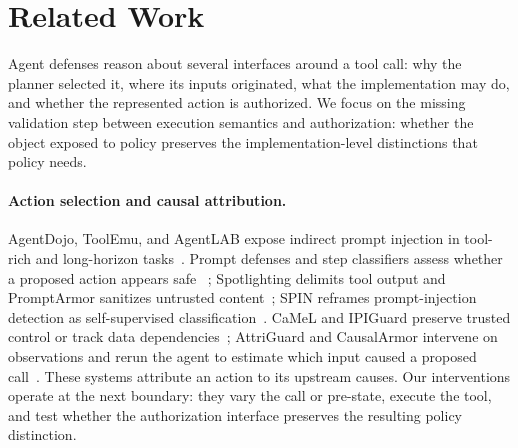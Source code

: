 \section{Related Work}

Agent defenses reason about several interfaces around a tool call: why the
planner selected it, where its inputs originated, what the implementation may
do, and whether the represented action is authorized. We focus on the missing
validation step between execution semantics and authorization: whether the
object exposed to policy preserves the implementation-level distinctions that
policy needs.

\paragraph{Action selection and causal attribution.}
AgentDojo, ToolEmu, and AgentLAB expose indirect prompt injection in tool-rich
and long-horizon tasks~\cite{agentdojo,toolemu,agentlab}. Prompt defenses and
step classifiers assess whether a proposed action appears safe
~\cite{toolsafe,safiron}; Spotlighting delimits tool output and PromptArmor
sanitizes untrusted content~\cite{spotlighting2024,promptarmor2025}; SPIN
reframes prompt-injection detection as self-supervised classification~\cite{zhou2024spin}. CaMeL and IPIGuard preserve trusted control or track
data dependencies~\cite{camel,ipiguard}; AttriGuard and CausalArmor intervene
on observations and rerun the agent to estimate which input caused a proposed
call~\cite{attriguard,causalarmor}. These systems attribute an action to its
upstream causes. Our interventions operate at the next boundary: they vary the
call or pre-state, execute the tool, and test whether the authorization
interface preserves the resulting policy distinction.

